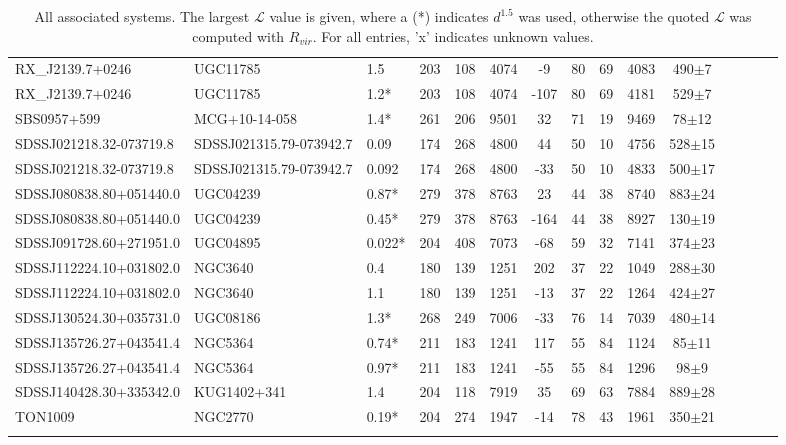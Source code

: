 \documentclass[iop]{emulateapj-rtx4}
\begin{document}
\begin{table}[ht]
\begin{center}
\begin{tabular}{l l l c c c c c c c c c c c c}
RX\_J2139.7+0246  &  UGC11785  &  1.5  &  203  &  108  &  4074  &  -9  &  80  &  69  &  4083  &  490$\pm$7  \\
RX\_J2139.7+0246  &  UGC11785  &  1.2*  &  203  &  108  &  4074  &  -107  &  80  &  69  &  4181  &  529$\pm$7  \\
SBS0957+599  &  MCG+10-14-058  &  1.4*  &  261  &  206  &  9501  &  32  &  71  &  19  &  9469  &  78$\pm$12  \\
SDSSJ021218.32-073719.8  &  SDSSJ021315.79-073942.7  &  0.09  &  174  &  268  &  4800  &  44  &  50  &  10  &  4756  &  528$\pm$15  \\
SDSSJ021218.32-073719.8  &  SDSSJ021315.79-073942.7  &  0.092  &  174  &  268  &  4800  &  -33  &  50  &  10  &  4833  &  500$\pm$17  \\
SDSSJ080838.80+051440.0  &  UGC04239  &  0.87*  &  279  &  378  &  8763  &  23  &  44  &  38  &  8740  &  883$\pm$24  \\
SDSSJ080838.80+051440.0  &  UGC04239  &  0.45*  &  279  &  378  &  8763  &  -164  &  44  &  38  &  8927  &  130$\pm$19  \\
SDSSJ091728.60+271951.0  &  UGC04895  &  0.022*  &  204  &  408  &  7073  &  -68  &  59  &  32  &  7141  &  374$\pm$23  \\
SDSSJ112224.10+031802.0  &  NGC3640  &  0.4  &  180  &  139  &  1251  &  202  &  37  &  22  &  1049  &  288$\pm$30  \\
SDSSJ112224.10+031802.0  &  NGC3640  &  1.1  &  180  &  139  &  1251  &  -13  &  37  &  22  &  1264  &  424$\pm$27  \\
SDSSJ130524.30+035731.0  &  UGC08186  &  1.3*  &  268  &  249  &  7006  &  -33  &  76  &  14  &  7039  &  480$\pm$14  \\
SDSSJ135726.27+043541.4  &  NGC5364  &  0.74*  &  211  &  183  &  1241  &  117  &  55  &  84  &  1124  &  85$\pm$11  \\
SDSSJ135726.27+043541.4  &  NGC5364  &  0.97*  &  211  &  183  &  1241  &  -55  &  55  &  84  &  1296  &  98$\pm$9  \\
SDSSJ140428.30+335342.0  &  KUG1402+341  &  1.4  &  204  &  118  &  7919  &  35  &  69  &  63  &  7884  &  889$\pm$28  \\
TON1009  &  NGC2770  &  0.19*  &  204  &  274  &  1947  &  -14  &  78  &  43  &  1961  &  350$\pm$21  \\
 \\
\hline
\end{tabular}
\end{center}
  \caption{\small{All associated systems. The largest $\mathcal{L}$ value is given, where a (\**) indicates $d^{1.5}$ was used, otherwise the quoted $\mathcal{L}$ was computed with $R_{vir}$. For all entries, 'x' indicates unknown values.}}
  \label{target_table}
\end{table}
\end{document}
